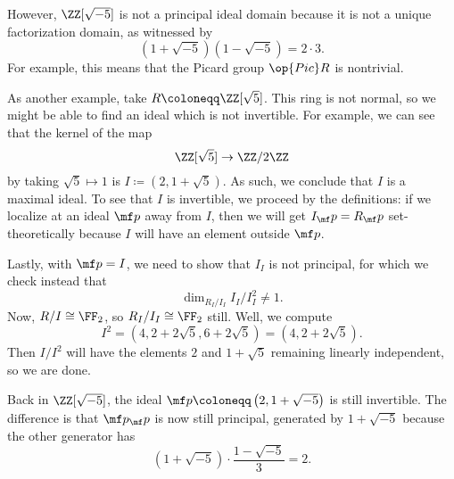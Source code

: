 However, $\ZZ[\sqrt{-5}]$ is not a principal ideal domain because it is not a unique factorization domain, as witnessed by
\[\left(1+\sqrt{-5}\right)\left(1-\sqrt{-5}\right)=2\cdot3.\]
For example, this means that the Picard group $\op{Pic}R$ is nontrivial.

As another example, take $R\coloneqq\ZZ[\sqrt5]$. This ring is not normal, so we might be able to find an ideal which is not invertible. For example, we can see that the kernel of the map
\[\ZZ[\sqrt5]\to\ZZ/2\ZZ\]
by taking $\sqrt5\mapsto1$ is $I\coloneqq\left(2,1+\sqrt5\right)$. As such, we conclude that $I$ is a maximal ideal. To see that $I$ is invertible, we proceed by the definitions: if we localize at an ideal $\mf p$ away from $I$, then we will get $I_\mf p=R_\mf p$ set-theoretically because $I$ will have an element outside $\mf p$.

Lastly, with $\mf p=I$, we need to show that $I_I$ is not principal, for which we check instead that
\[\dim_{R_I/I_I}I_I/I_I^2\ne1.\]
Now, $R/I\cong\FF_2$, so $R_I/I_I\cong\FF_2$ still. Well, we compute
\[I^2=\left(4,2+2\sqrt5,6+2\sqrt5\right)=\left(4,2+2\sqrt5\right).\]
Then $I/I^2$ will have the elements $2$ and $1+\sqrt5$ remaining linearly independent, so we are done.
\begin{remark}
	Back in $\ZZ[\sqrt{-5}]$, the ideal $\mf p\coloneqq\left(2,1+\sqrt{-5}\right)$ is still invertible. The difference is that $\mf p_\mf p$ is now still principal, generated by $1+\sqrt{-5}$ because the other generator has
	\[\left(1+\sqrt{-5}\right)\cdot\frac{1-\sqrt{-5}}3=2.\]
\end{remark}

